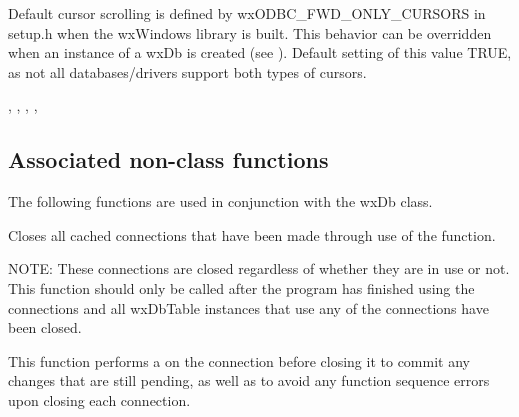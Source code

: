 



Default cursor scrolling is defined by wxODBC\_FWD\_ONLY\_CURSORS in setup.h
when the wxWindows library is built.  This behavior can be overridden when
an instance of a wxDb is created (see ).
Default setting of this value TRUE, as not all databases/drivers support
both types of cursors.


, ,
, ,

\subsection{Associated non-class functions}\label{wxdbfunctions}

The following functions are used in conjunction with the wxDb class.



Closes all cached connections that have been made through use of the
 function.

NOTE: These connections are closed regardless of whether they are in use
or not.  This function should only be called after the program has
finished using the connections and all wxDbTable instances that use any of
the connections have been closed.

This function performs a 
on the connection before closing it to commit any changes that are still
pending, as well as to avoid any function sequence errors upon closing
each connection.


